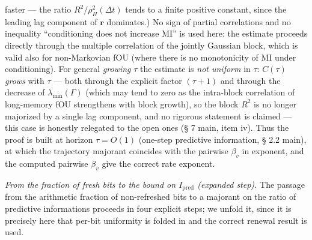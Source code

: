 \documentclass[12pt]{iopart}
\begin{document}
faster --- the ratio \(R^2/\rho_H^2(\Delta t)\) tends to a finite positive constant, since the leading lag component of \(\mathbf r\) dominates.) No sign of partial correlations and no inequality ``conditioning does not increase MI'' is used here: the estimate proceeds directly through the multiple correlation of the jointly Gaussian block, which is valid also for non-Markovian fOU (where there is no monotonicity of MI under conditioning). For general \emph{growing} \(\tau\) the estimate is \emph{not uniform} in \(\tau\): \(C(\tau)\) \emph{grows} with \(\tau\) --- both through the explicit factor \((\tau+1)\) and through the decrease of \(\lambda_{\min}(\Gamma)\) (which may tend to zero as the intra-block correlation of long-memory fOU strengthens with block growth), so the block \(R^2\) is no longer majorized by a single lag component, and no rigorous statement is claimed --- this case is honestly relegated to the open ones (§ 7 main, item iv). Thus the proof is built at horizon \(\tau = O(1)\) (one-step predictive information, § 2.2 main), at which the trajectory majorant coincides with the pairwise \(\beta_v\) in exponent, and the computed pairwise \(\beta_v\) give the correct rate exponent.



\emph{From the fraction of fresh bits to the bound on \(I_{\text{pred}}\) (expanded step).} The passage from the arithmetic fraction of non-refreshed bits to a majorant on the ratio of predictive informations proceeds in four explicit steps; we unfold it, since it is precisely here that per-bit uniformity is folded in and the correct renewal result is used.
\end{document}

